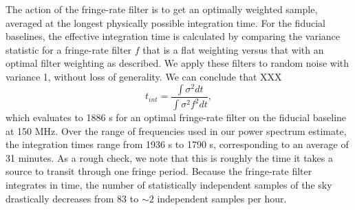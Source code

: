 \documentclass[twocolumn,numberedappendix]{emulateapj} \shorttitle{New Limits on the 21 cm Power Spectrum at $z=8.4$}
\begin{document}
The action of the fringe-rate filter is to get an optimally weighted
sample, averaged at the longest physically possible integration time.  For the
fiducial baselines, the effective
integration time is calculated by comparing the variance statistic for a
fringe-rate filter $f$ that is a flat weighting versus that with an optimal filter
weighting as described. We apply these filters to random noise with variance 1,
without loss of generality. We can conclude that 
XXX 
\begin{equation}
    t_{int} = \frac{\int{\sigma^{2}dt}}{\int{\sigma^{2}f^{2}dt}},
\end{equation}
which evaluates to 1886 s for an optimal fringe-rate filter on the fiducial 
baseline at 150 MHz.  Over the range of frequencies used in our power spectrum
estimate, the integration times range from 1936 s to 1790 s, corresponding to an
average of 31 minutes. As a rough check, we note that this is roughly the time
it takes a source to transit through one fringe period.
Because
the fringe-rate filter integrates in time, the number of statistically
independent samples of the sky drastically decreases from 83 to $\sim2$
independent samples per hour.

%

\end{document}
